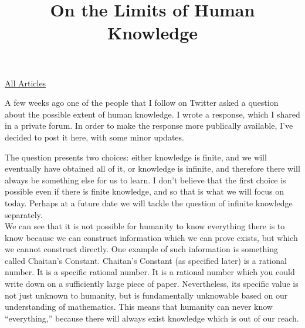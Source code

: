 \documentclass{article}
\title{On the Limits of Human Knowledge}
\begin{document}
\maketitle
\begin{center}
  \href{../index.html}{All Articles}
\end{center}
A few weeks ago one of the people that I follow on Twitter asked a question about the possible extent of human knowledge. I wrote a response, which I shared in a private forum. In order to make the response more publically available, I've decided to post it here, with some minor updates.\\


The question presents two choices: either knowledge is finite, and we will eventually have obtained all of it, or knowledge is infinite, and therefore there will always be something else for us to learn. I don't believe that the first choice is possible even if there is finite knowledge, and so that is what we will focus on today. Perhaps at a future date we will tackle the question of infinite knowledge separately.\\

We can see that it is not possible for humanity to know everything there is to know because we can construct information which we can prove exists, but which we cannot construct directly. One example of such information is something called Chaitan's Constant. Chaitan's Constant (as specified later) is a rational number. It is a specific rational number. It is a rational number which you could write down on a sufficiently large piece of paper. Nevertheless, its specific value is not just unknown to humanity, but is fundamentally unknowable based on our understanding of mathematics. This means that humanity can never know ``everything,'' because there will always exist knowledge which is out of our reach.\\
\end{document}
